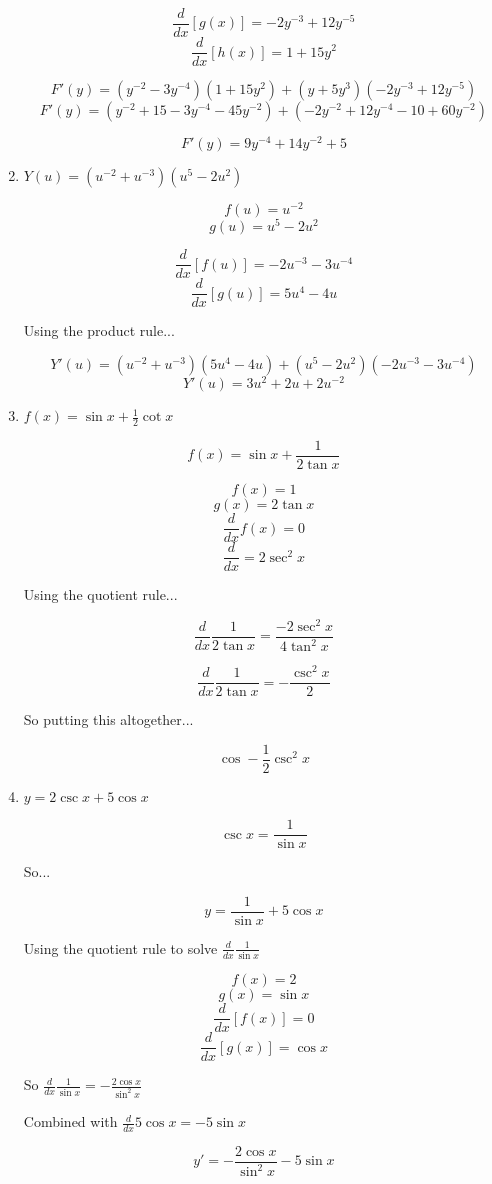 \documentclass{article}
\begin{document}
\begin{enumerate}
			$$\frac{d}{dx} [g(x)] = -2y^{-3} + 12y^{-5}$$
			$$\frac{d}{dx} [h(x)] = 1 + 15y^2$$

			$$F'(y) = (y^{-2} - 3y^{-4})(1 + 15y^2) + (y + 5y^{3})(-2y^{-3} + 12y^{-5})$$
			$$F'(y) = (y^{-2} + 15 - 3y^{-4} - 45y^{-2}) + (-2y^{-2} + 12y^{-4} - 10 + 60y^{-2})$$

			$$F'(y) = 9y^{-4} + 14y^{-2} + 5$$

		\item $Y(u) = (u^{-2} + u^{-3})(u^{5}-2u^{2})$

			$$f(u) = u^{-2}$$
			$$g(u) = u^{5} - 2u^{2}$$

			$$\frac{d}{dx} [f(u)] = -2u^{-3} - 3u^{-4}$$
			$$\frac{d}{dx} [g(u)] = 5u^4 - 4u$$

			Using the product rule...

			$$Y'(u) = (u^{-2} + u^{-3})(5u^{4} - 4u) + (u^5 - 2u^2)(-2u^{-3} - 3u^{-4})$$
			$$Y'(u) = 3u^2 + 2u + 2u^{-2}$$

		\item $f(x) = \sin x + \frac{1}{2} \cot x$

			$$f(x) = \sin x + \frac{1}{2\tan x}$$
			
			$$f(x) = 1$$
			$$g(x) = 2\tan x$$
			$$\frac{d}{dx} f(x) = 0$$
			$$\frac{d}{dx} = 2\sec ^{2} x$$

			Using the quotient rule...

			$$\frac{d}{dx} \frac{1}{2\tan x} = \frac{- 2\sec ^{2} x}{4 \tan ^{2} x}$$

			$$\frac{d}{dx} \frac{1}{2\tan x} = - \frac{\csc ^{2} x}{2}$$

			So putting this altogether...

			$$\cos - \frac{1}{2} \csc ^{2} x$$

		\item $y = 2\csc x + 5 \cos x$

			$$\csc x = \frac{1}{\sin x}$$

			So...

			$$y = \frac{1}{\sin x} + 5\cos x$$

			Using the quotient rule to solve $\frac{d}{dx} \frac{1}{\sin x}$

			$$f(x) = 2$$
			$$g(x) = \sin x$$
			$$\frac{d}{dx} [f(x)] = 0$$
			$$\frac{d}{dx} [g(x)] = \cos x$$

			So $\frac{d}{dx} \frac{1}{\sin x} = - \frac{2\cos x}{\sin^{2} x}$

			Combined with $\frac{d}{dx} 5\cos x = - 5\sin x$

			$$y' = - \frac{2\cos x}{\sin^{2} x} - 5 \sin x$$
			

\end{enumerate}
\end{document}
